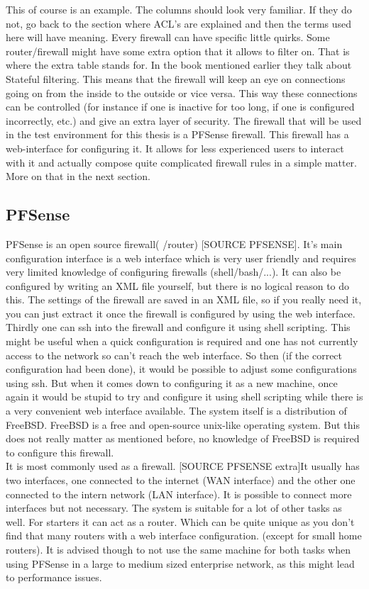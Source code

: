 This of course is an example. The columns should look very familiar. If they do not, go back to the section where ACL's are explained and then the terms used here will have meaning.
Every firewall can have specific little quirks. Some router/firewall might have some extra option that it allows to filter on. That is where the extra table stands for. In the book mentioned earlier they talk about Stateful filtering. This means that the firewall will keep an eye on connections going on from the inside to the outside or vice versa. This way these connections can be controlled (for instance if one is inactive for too long, if one is configured incorrectly, etc.) and give an extra layer of security. The firewall that will be used in the test environment for this thesis is a PFSense firewall. This firewall has a web-interface for configuring it. It allows for less experienced users to interact with it and actually compose quite complicated firewall rules in a simple matter. More on that in the next section.
\subsection{PFSense}
PFSense is an open source firewall( /router) [SOURCE PFSENSE]. It's main configuration interface is a web interface which is very user friendly and requires very limited knowledge of configuring firewalls (shell/bash/...). It can also be configured by writing an XML file yourself, but there is no logical reason to do this. The settings of the firewall are saved in an XML file, so if you really need it, you can just extract it once the firewall is configured by using the web interface. Thirdly one can ssh into the firewall and configure it using shell scripting. This might be useful when a quick configuration is required and one has not currently access to the network so can't reach the web interface. So then (if the correct configuration had been done), it would be possible to adjust some configurations using ssh. But when it comes down to configuring it as a new machine, once again it would be stupid to try and configure it using shell scripting while there is a very convenient web interface available.
The system itself is a distribution of FreeBSD. FreeBSD is a free and open-source unix-like operating system. But this does not really matter as mentioned before, no knowledge of FreeBSD is required to configure this firewall.\\
It is most commonly used as a firewall. [SOURCE PFSENSE extra]It usually has two interfaces, one connected to the internet (WAN interface) and the other one connected to the intern network (LAN interface). It is possible to connect more interfaces but not necessary. The system is suitable for a lot of other tasks as well. For starters it can act as a router. Which can be quite unique as you don't find that many routers with a web interface configuration. (except for small home routers). It is advised though to not use the same machine for both tasks when using PFSense in a large to medium sized enterprise network, as this might lead to performance issues.\\

